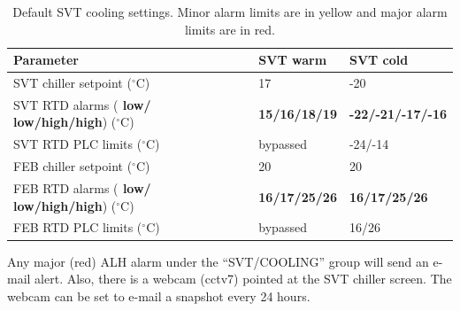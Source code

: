 \begin{table}[h]
\begin{center}
\begin{tabular}{|l|l|l|}
\hline
Parameter & SVT warm & SVT cold \\
\hline
SVT chiller setpoint ($^\circ$C) & 17 & -20 \\
SVT RTD alarms (\textbf{{\color{red} low}/{\color{yellow} low}/{\color{yellow}high}/{\color{red}high}}) ($^\circ$C) & \textbf{{\color{red}15}/{\color{yellow}16}/{\color{yellow}18}/{\color{red}19}} & \textbf{{\color{red}-22}/{\color{yellow}-21}/{\color{yellow}-17}/{\color{red}-16}} \\
SVT RTD PLC limits ($^\circ$C) & bypassed & -24/-14 \\
FEB chiller setpoint ($^\circ$C) & 20 & 20 \\
FEB RTD alarms (\textbf{{\color{red} low}/{\color{yellow} low}/{\color{yellow}high}/{\color{red}high}}) ($^\circ$C) & \textbf{{\color{red}16}/{\color{yellow}17}/{\color{yellow}25}/{\color{red}26}} & \textbf{{\color{red}16}/{\color{yellow}17}/{\color{yellow}25}/{\color{red}26}} \\
FEB RTD PLC limits ($^\circ$C) & bypassed & 16/26 \\
\hline
\end{tabular}
\end{center}
\caption{Default SVT cooling settings.  Minor alarm limits are in yellow and major alarm limits are in red.}
\label{tab:cooling_settings} 
\end{table}

Any major (red) ALH alarm under the ``SVT/COOLING'' group will send an e-mail alert. Also, there is a webcam (cctv7) pointed at the SVT chiller screen. The webcam can be set to e-mail a snapshot every 24 hours. 